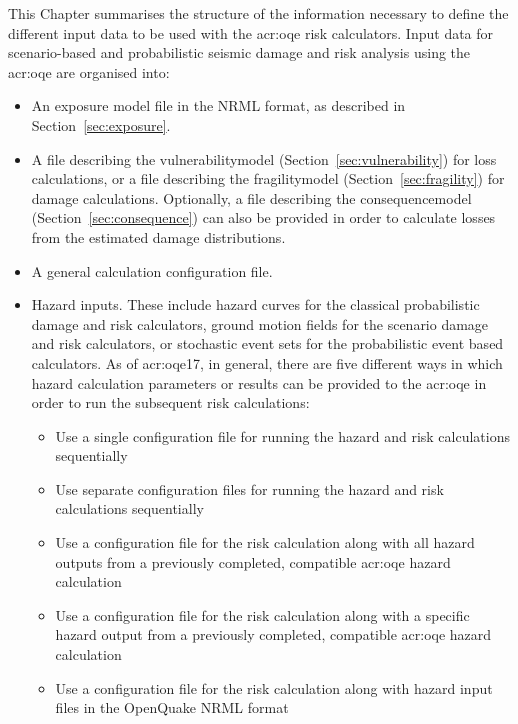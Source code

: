 This Chapter summarises the structure of the information necessary to define
the different input data to be used with the \glsdesc{acr:oqe} risk
calculators. Input data for scenario-based and probabilistic seismic damage
and risk analysis using the \glsdesc{acr:oqe} are organised into:

\begin{itemize}

  \item An exposure model file in the NRML format, as described in 
    Section~\ref{sec:exposure}.

  \item A file describing the \gls{vulnerabilitymodel}
    (Section~\ref{sec:vulnerability}) for loss calculations, or a 
  	file describing the \gls{fragilitymodel} (Section~\ref{sec:fragility})
    for damage calculations. Optionally, a file describing the
    \gls{consequencemodel} (Section~\ref{sec:consequence}) can also be
  	provided in order to calculate losses from the estimated damage
  	distributions.

  \item A general calculation configuration file.

  \item Hazard inputs. These include hazard curves for the classical
    probabilistic damage and risk calculators, ground motion fields for the
    scenario damage and risk calculators, or stochastic event sets for the
    probabilistic event based calculators. As of \glsdesc{acr:oqe17}, in
    general, there are five different ways in which hazard calculation
    parameters or results can be provided to the \glsdesc{acr:oqe} in order to
    run the subsequent risk calculations:

    \begin{itemize}

      \item Use a single configuration file for running the hazard and risk
      calculations sequentially

      \item Use separate configuration files for running the hazard and risk
      calculations sequentially

      \item Use a configuration file for the risk calculation along with all
      hazard outputs from a previously completed, compatible
      \glsdesc{acr:oqe} hazard calculation

      \item Use a configuration file for the risk calculation along with a
      specific hazard output from a previously completed, compatible
      \glsdesc{acr:oqe} hazard calculation

      \item Use a configuration file for the risk calculation along with
      hazard input files in the OpenQuake NRML format

    \end{itemize}

\end{itemize}

